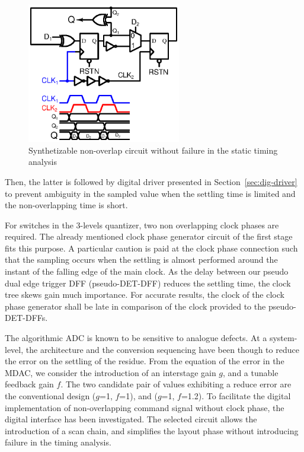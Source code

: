 \begin{figure}[htp]
	\centering
	\includegraphics[width=0.6\textwidth]{Chapter4/Figs/det-dff-hildebrandt.ps}
	\caption{Synthetizable non-overlap circuit without failure in the static timing analysis}
	\label{fig:digital-non-overlap}
\end{figure}

Then, the latter is followed by digital driver presented in Section~\ref{sec:dig-driver} to prevent ambiguity in the sampled value when the settling time is limited and the non-overlapping time is short.

For switches in the 3-levels quantizer, two non overlapping clock phases are required. The already mentioned clock phase generator circuit of the first stage fits this purpose. A particular caution is paid at the clock phase connection such that the sampling occurs when the settling is almost performed around the instant of the falling edge of the main clock. As the delay between our pseudo dual edge trigger DFF (pseudo-DET-DFF) reduces the settling time, the clock tree skews gain much importance. For accurate results, the clock of the clock phase generator shall be late in comparison of the clock provided to the pseudo-DET-DFFs.

The algorithmic ADC is known to be sensitive to analogue defects. At a system-level, the architecture and the conversion sequencing have been though to reduce the error on the settling of the residue. From the equation of the error in the MDAC, we consider the introduction of an interstage gain $g$, and a tunable feedback gain $f$. The two candidate pair of values exhibiting a reduce error are the conventional design ($g$=1, $f$=1), and ($g$=1, $f$=1.2).
To facilitate the digital implementation of non-overlapping command signal without clock phase, the digital interface has been investigated. The selected circuit allows the introduction of a scan chain, and simplifies the layout phase without introducing failure in the timing analysis.
\clearpage
